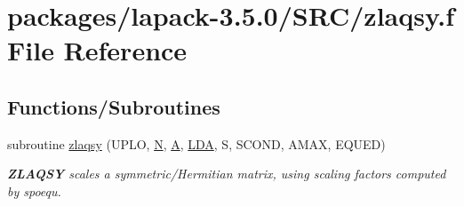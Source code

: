 \hypertarget{zlaqsy_8f}{}\section{packages/lapack-\/3.5.0/\+S\+R\+C/zlaqsy.f File Reference}
\label{zlaqsy_8f}
\subsection*{Functions/\+Subroutines}
\begin{DoxyCompactItemize}
\item 
subroutine \hyperlink{group__complex16SYauxiliary_ga32c00d5ce9d568146d9396257bdea188}{zlaqsy} (U\+P\+L\+O, \hyperlink{polmisc_8c_a0240ac851181b84ac374872dc5434ee4}{N}, \hyperlink{classA}{A}, \hyperlink{example__user_8c_ae946da542ce0db94dced19b2ecefd1aa}{L\+D\+A}, S, S\+C\+O\+N\+D, A\+M\+A\+X, E\+Q\+U\+E\+D)
\begin{DoxyCompactList}\small\item\em {\bfseries Z\+L\+A\+Q\+S\+Y} scales a symmetric/\+Hermitian matrix, using scaling factors computed by spoequ. \end{DoxyCompactList}\end{DoxyCompactItemize}
